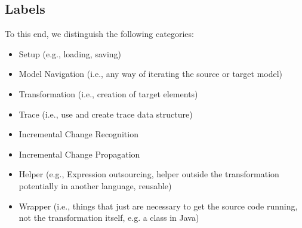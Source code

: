\documentclass{article}
\begin{document}

    \subsection*{Labels}
    To this end,  we distinguish the following categories:
        {\it         
        \begin{itemize}[noitemsep]
            \item Setup \hspace{5pt} (e.g., loading, saving)
            \item Model Navigation  \hspace{5pt} (i.e., any way of iterating the source or target model)
            \item Transformation \hspace{5pt} (i.e., creation of target elements)
            \item Trace \hspace{5pt} (i.e., use and create trace data structure)
    
            \item Incremental Change Recognition
            \item Incremental Change Propagation
            \item Helper \hspace{5pt} (e.g., Expression outsourcing, helper outside the transformation potentially in another language, reusable) 
            
            \item Wrapper \hspace{5pt} (i.e., things that just are necessary to get the source code running, not the transformation itself, e.g. a class in Java)
        \end{itemize}}
 
\end{document}
